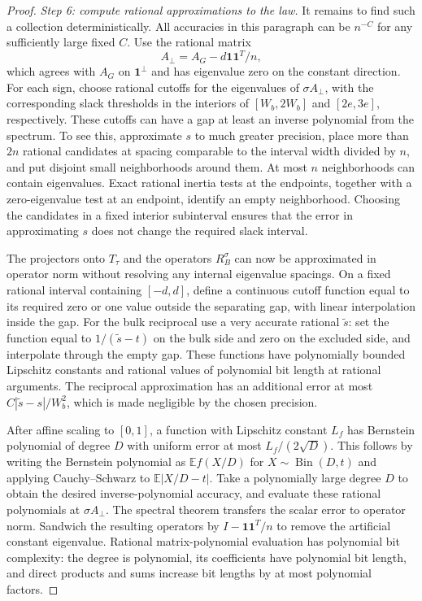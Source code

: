 \begin{proof}
\par\smallskip\noindent\textit{Step 6: compute rational approximations to the law.}\quad
It remains to find such a collection deterministically.  All accuracies in
this paragraph can be $n^{-C}$ for any sufficiently large fixed $C$.
Use the rational matrix
\[
 A_\perp=A_G-d\mathbf 1\mathbf 1^T/n,
\]
which agrees with $A_G$ on $\mathbf 1^\perp$ and has eigenvalue zero on the
constant direction.  For each sign, choose rational cutoffs for the eigenvalues
of $\sigma A_\perp$, with the corresponding slack thresholds in the interiors
of $[W_b,2W_b]$ and $[2e,3e]$, respectively.  These cutoffs can have a gap at
least an inverse polynomial from the spectrum.  To see this, approximate $s$
to much greater precision, place more than $2n$ rational candidates at spacing
comparable to the interval width divided by $n$, and put disjoint small
neighborhoods around them.  At most $n$ neighborhoods can contain eigenvalues.
Exact rational inertia tests at the endpoints, together with a zero-eigenvalue
test at an endpoint, identify an empty neighborhood.  Choosing the candidates
in a fixed interior subinterval ensures that the error in approximating $s$
does not change the required slack interval.

The projectors onto $T_\tau$ and the operators $R_B^\sigma$ can now be
approximated in operator norm without resolving any internal eigenvalue
spacings.  On a fixed rational interval containing $[-d,d]$, define a continuous
cutoff function equal to its required zero or one value outside the separating
gap, with linear interpolation inside the gap.  For the bulk reciprocal use a
very accurate rational $\widetilde s$: set the function equal to
$1/(\widetilde s-t)$ on the bulk side and zero on the excluded side, and
interpolate through the empty gap.  These functions have polynomially bounded
Lipschitz constants and rational values of polynomial bit length at rational
arguments.  The reciprocal approximation has an additional error at most
$C|\widetilde s-s|/W_b^2$, which is made negligible by the chosen precision.

After affine scaling to $[0,1]$, a function with Lipschitz constant $L_f$ has
Bernstein polynomial \cite{Bernstein1912} of degree $D$ with uniform error at most
$L_f/(2\sqrt D)$.  This follows by writing the Bernstein polynomial as
$\mathbb E f(X/D)$ for $X\sim\operatorname{Bin}(D,t)$ and applying
Cauchy--Schwarz to $\mathbb E|X/D-t|$.
Take a polynomially large degree $D$ to obtain the desired inverse-polynomial
accuracy, and evaluate these rational polynomials at $\sigma A_\perp$.
The spectral theorem transfers the scalar error to operator norm.
Sandwich the resulting operators by $I-\mathbf 1\mathbf 1^T/n$ to remove the
artificial constant eigenvalue.  Rational matrix-polynomial evaluation has
polynomial bit complexity: the degree is polynomial, its coefficients have
polynomial bit length, and direct products and sums increase bit lengths by
at most polynomial factors.


\end{proof}
